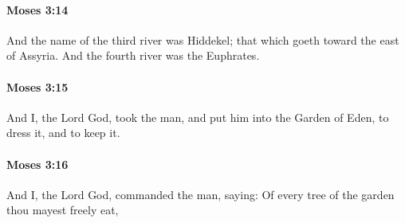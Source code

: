 		\paragraph{Moses 3:14} %
			\label{MOSES-3-14}

			And the name of the third river was Hiddekel; that which goeth toward the east of Assyria. And the fourth river was the Euphrates.


		\paragraph{Moses 3:15} %
			\label{MOSES-3-15}

			And I, the Lord God, took the man, and put him into the Garden of Eden, to dress it, and to keep it.


		\paragraph{Moses 3:16} %
			\label{MOSES-3-16}

			And I, the Lord God, commanded the man, saying: Of every tree of the garden thou mayest freely eat,


